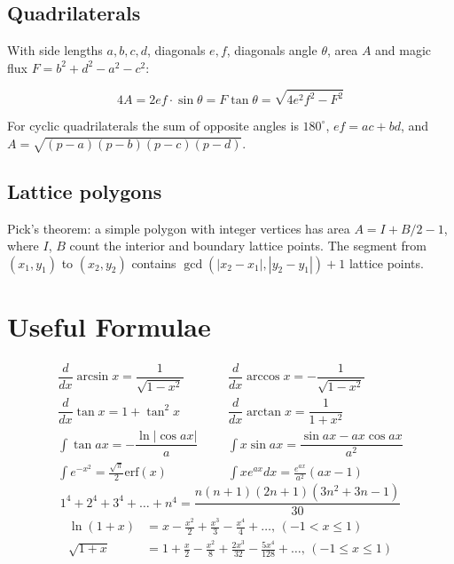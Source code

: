 \subsection{Quadrilaterals}
With side lengths $a,b,c,d$, diagonals $e, f$, diagonals angle $\theta$, area $A$ and
magic flux $F=b^2+d^2-a^2-c^2$:

\[ 4A = 2ef \cdot \sin\theta = F\tan\theta = \sqrt{4e^2f^2-F^2} \]

 For cyclic quadrilaterals the sum of opposite angles is $180^\circ$,
$ef = ac + bd$, and $A = \sqrt{(p-a)(p-b)(p-c)(p-d)}$.

\subsection{Lattice polygons}
Pick's theorem: a simple polygon with integer vertices has area $A = I + B/2 - 1$, where $I$, $B$ count the interior and boundary lattice points.
The segment from $(x_1,y_1)$ to $(x_2,y_2)$ contains $\gcd(|x_2 - x_1|, |y_2 - y_1|) + 1$ lattice points.

\section{Useful Formulae}
\begin{align*}
	\dfrac{d}{dx}\arcsin x = \dfrac{1}{\sqrt{1-x^2}} &&& \dfrac{d}{dx}\arccos x = -\dfrac{1}{\sqrt{1-x^2}} \\
	\dfrac{d}{dx}\tan x = 1+\tan^2 x &&& \dfrac{d}{dx}\arctan x = \dfrac{1}{1+x^2} \\
	\int\tan ax = -\dfrac{\ln|\cos ax|}{a} &&& \int x\sin ax = \dfrac{\sin ax-ax \cos ax}{a^2} \\
	\int e^{-x^2} = \frac{\sqrt \pi}{2} \text{erf}(x) &&& \int xe^{ax}dx = \frac{e^{ax}}{a^2}(ax-1) 
\end{align*}
$$1^4 + 2^4 + 3^4 + \dots + n^4 = \frac{n(n+1)(2n+1)(3n^2 + 3n - 1)}{30}$$
\begin{align*}
    \ln(1+x) &= x-\frac{x^2}{2}+\frac{x^3}{3}-\frac{x^4}{4}+\dots,\,(-1<x\leq1) \\
    \sqrt{1+x} &= 1+\frac{x}{2}-\frac{x^2}{8}+\frac{2x^3}{32}-\frac{5x^4}{128}+\dots,\,(-1\leq x\leq1)
\end{align*}
